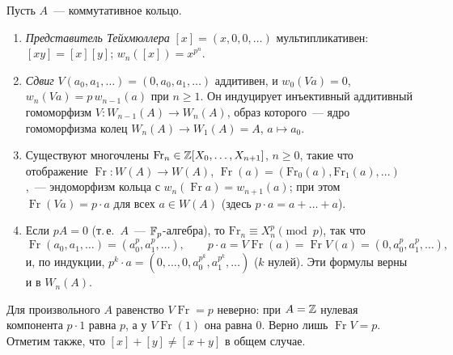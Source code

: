 \begin{proposition}
Пусть $A$~--- коммутативное кольцо.
\begin{enumerate}[label=\textup{(\alph*)}]
\item \emph{Представитель Тейхмюллера} $[x]=(x,0,0,\dots)$ мультипликативен: $[xy]=[x][y]$; $w_n([x])=x^{p^n}$.
\item \emph{Сдвиг} $V(a_0,a_1,\dots)=(0,a_0,a_1,\dots)$ аддитивен, и $w_0(Va)=0$, $w_n(Va)=p\,w_{n-1}(a)$ при $n\ge1$. Он
индуцирует инъективный аддитивный гомоморфизм $V\colon W_{n-1}(A)\to W_n(A)$, образ которого~--- ядро гомоморфизма колец
$W_n(A)\to W_1(A)=A$, $a\mapsto a_0$.
\item Существуют многочлены $\mathrm{Fr}_n\in\mathbb Z[X_0,\dots,X_{n+1}]$, $n\ge0$, такие что отображение
$\operatorname{Fr}\colon W(A)\to W(A)$, $\operatorname{Fr}(a)=(\mathrm{Fr}_0(a),\mathrm{Fr}_1(a),\dots)$,~--- эндоморфизм
кольца с $w_n(\operatorname{Fr}a)=w_{n+1}(a)$; при этом $\operatorname{Fr}(Va)=p\cdot a$ для всех $a\in W(A)$ (здесь
$p\cdot a=a+\dots+a$).
\item Если $pA=0$ (т.\,е.\ $A$~--- $\mathbb F_p$-алгебра), то $\mathrm{Fr}_n\equiv X_n^p\pmod p$, так что
\[
\operatorname{Fr}(a_0,a_1,\dots)=(a_0^p,a_1^p,\dots),\qquad p\cdot a=V\operatorname{Fr}(a)=\operatorname{Fr}V(a)=(0,a_0^p,a_1^p,\dots),
\]
и, по индукции, $p^k\cdot a=(0,\dots,0,a_0^{p^k},a_1^{p^k},\dots)$ ($k$ нулей). Эти формулы верны и в $W_n(A)$.
\end{enumerate}
\end{proposition}

Для произвольного $A$ равенство $V\operatorname{Fr}=p$ неверно: при $A=\mathbb Z$ нулевая компонента $p\cdot1$ равна $p$, а у
$V\operatorname{Fr}(1)$ она равна $0$. Верно лишь $\operatorname{Fr}V=p$. Отметим также, что $[x]+[y]\ne[x+y]$ в общем случае.

